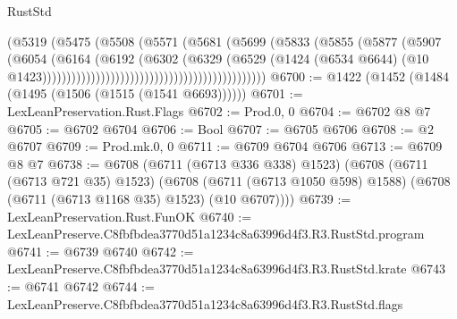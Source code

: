 \begin{lexlean}{RustStd}
\begin{coremodule}
                                                            (@5319
                                                              (@5475
                                                                (@5508
                                                                  (@5571
                                                                    (@5681
                                                                      (@5699
                                                                        (@5833
                                                                          (@5855
                                                                            (@5877
                                                                              (@5907
                                                                                (@6054
                                                                                  (@6164
                                                                                    (@6192
                                                                                      (@6302
                                                                                        (@6329
                                                                                          (@6529
                                                                                            (@1424
                                                                                              (@6534
                                                                                                @6644)
                                                                                              (@10
                                                                                                @1423))))))))))))))))))))))))))))))))))))))))))))))
@6700 := @1422 (@1452 (@1484 (@1495 (@1506 (@1515 (@1541 @6693))))))
@6701 := LexLeanPreservation.Rust.Flags
@6702 := Prod.{0, 0}
@6704 := @6702 @8 @7
@6705 := @6702 @6704
@6706 := Bool
@6707 := @6705 @6706
@6708 := @2 @6707
@6709 := Prod.mk.{0, 0}
@6711 := @6709 @6704 @6706
@6713 := @6709 @8 @7
@6738 := @6708
    (@6711 (@6713 @336 @338) @1523)
    (@6708
      (@6711 (@6713 @721 @35) @1523)
      (@6708 (@6711 (@6713 @1050 @598) @1588) (@6708 (@6711 (@6713 @1168 @35) @1523) (@10 @6707))))
@6739 := LexLeanPreservation.Rust.FunOK
@6740 := LexLeanPreserve.C8fbfbdea3770d51a1234c8a63996d4f3.R3.RustStd.program
@6741 := @6739 @6740
@6742 := LexLeanPreserve.C8fbfbdea3770d51a1234c8a63996d4f3.R3.RustStd.krate
@6743 := @6741 @6742
@6744 := LexLeanPreserve.C8fbfbdea3770d51a1234c8a63996d4f3.R3.RustStd.flags

\end{coremodule}
\end{lexlean}
